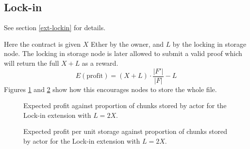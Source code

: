 \documentclass[12pt,a4paper,twoside,openright]{report}
\begin{document}
\subsection{Lock-in}

See section \ref{ext-lockin} for details.

Here the contract is given $X$ Ether by the owner, and $L$ by the locking in storage node.
The locking in storage node is later allowed to submit a valid proof which will return the full $X + L$ as a reward.
\[E(\text{profit}) = (X + L) \cdot \frac{|F'|}{|F|} - L\]
Figures \ref{eval-graph-lockin} and \ref{eval-graph-lockin-storage} show how this encourages nodes to store the whole file.

\begin{figure}[H]
\caption[Expected attacker profit: lock-in]{Expected profit against proportion of chunks stored by actor for the Lock-in extension with $L = 2X$.}
\label{eval-graph-lockin}
\end{figure}

\begin{figure}[H]
\caption[Expected attacker profit per unit storage: lock-in]{Expected profit per unit storage against proportion of chunks stored by actor for the Lock-in extension with $L = 2X$.}
\label{eval-graph-lockin-storage}
\end{figure}
\end{document}
